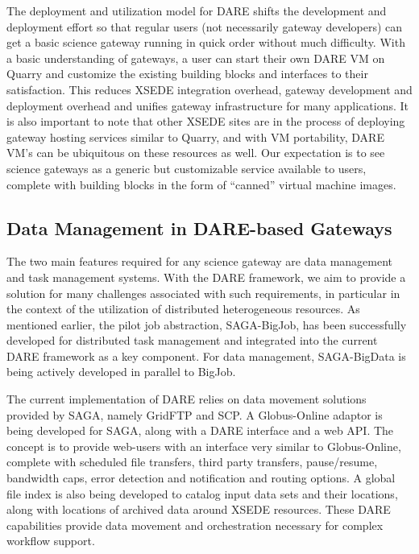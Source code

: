 \documentclass[]{svjour3}
\begin{document}
The deployment and utilization model for DARE shifts the development
and deployment effort so that regular users (not necessarily gateway
developers) can get a basic science gateway running in quick order
without much difficulty. With a basic understanding of gateways, a
user can start their own DARE VM on Quarry and customize the existing
building blocks and interfaces to their satisfaction. This reduces
XSEDE integration overhead, gateway development and deployment
overhead and unifies gateway infrastructure for many applications. It
is also important to note that other XSEDE sites are in the process of
deploying gateway hosting services similar to Quarry, and with VM
portability, DARE VM's can be ubiquitous on these resources as
well. Our expectation is to see science gateways as a generic but
customizable service available to users, complete with building blocks
in the form of ``canned'' virtual machine images.


\subsection{Data Management in DARE-based Gateways}

The two main features required for any science gateway are data
management and task management systems. With the DARE framework, we
aim to provide a solution for many challenges associated with such
requirements, in particular in the context of the utilization of
distributed heterogeneous resources. As mentioned earlier, the pilot
job abstraction, SAGA-BigJob, has been successfully developed for
distributed task management and integrated into the current DARE
framework as a key component. For data management, SAGA-BigData is
being actively developed in parallel to BigJob.

The current implementation of DARE relies on data movement solutions
provided by SAGA, namely GridFTP and SCP. A Globus-Online adaptor is
being developed for SAGA, along with a DARE interface and a web
API. The concept is to provide web-users with an interface very
similar to Globus-Online, complete with scheduled file transfers,
third party transfers, pause/resume, bandwidth caps, error detection
and notification and routing options. A global file index is also
being developed to catalog input data sets and their locations, along
with locations of archived data around XSEDE resources. These DARE
capabilities provide data movement and orchestration necessary for
complex workflow support.
\end{document}
